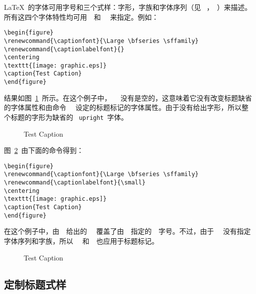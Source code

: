 \LaTeX{}~的字体可用字号和三个式样：字形，字族和字体序列（见
~\cite[第~37,115~页]{Leslie}，~\cite[第~170-171~页]{Michel}）来描述。
所有这四个字体特性均可用~~和~~
来指定。例如：
\begin{Verbatim}[xleftmargin=1cm]
\begin{figure} 
\renewcommand{\captionfont}{\Large \bfseries \sffamily} 
\renewcommand{\captionlabelfont}{} 
\centering 
\texttt{[image: graphic.eps]} 
\caption{Test Caption} 
\end{figure}
\end{Verbatim}
结果如图~\ref{fig:captionfont}~所示。在这个例子中，~~
没有是空的，这意味着它没有改变标题缺省的字体属性和由命令~~
设定的标题标记的字体属性。由于没有给出字形，所以整个标题的字形为缺省的~
\texttt{upright}~字体。

\begin{figure} 
	\renewcommand{\captionfont}{\Large \bfseries \sffamily} 
	\renewcommand{\captionlabelfont}{} 
	\centering 
	\resizebox{2in}{!}{\usebox{\graphic}}
	\caption{Test Caption}\label{fig:captionfont}
\end{figure}

图~\ref{fig:captionfont-1}~由下面的命令得到：
\begin{Verbatim}[xleftmargin=1cm]
\begin{figure} 
\renewcommand{\captionfont}{\Large \bfseries \sffamily} 
\renewcommand{\captionlabelfont}{\small} 
\centering 
\texttt{[image: graphic.eps]} 
\caption{Test Caption} 
\end{figure}
\end{Verbatim}
在这个例子中，由~~给出的~~
覆盖了由~~指定的~~字号。不过，由于
~~没有指定字体序列和字族，所以~~
和~~也应用于标题标记。

\begin{figure} 
	\renewcommand{\captionfont}{\Large \bfseries \sffamily} 
	\renewcommand{\captionlabelfont}{\small} 
	\centering 
	\resizebox{2in}{!}{\usebox{\graphic}}
	\caption{Test Caption}\label{fig:captionfont-1}
\end{figure}

\subsection{定制标题式样}

